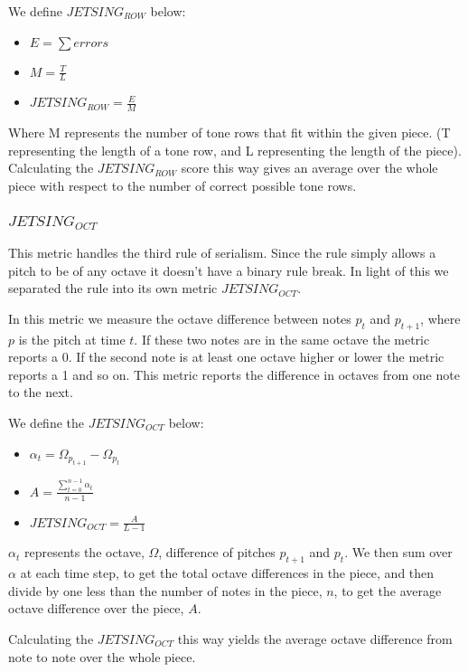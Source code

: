 \documentclass[11pt]{article}
\begin{document}
We define $JETSING_{ROW}$ below:
\begin{itemize}
    \item $E = \sum errors $
    \item $M = \frac{T}{L}$
    \item $JETSING_{ROW} = \frac{E}{M}$
\end{itemize}

Where M represents the number of tone rows that fit within the given piece.
(T representing the length of a tone row, and L representing the length of the piece).
Calculating the $JETSING_{ROW}$ score this way gives an average over the whole piece with respect to the number of correct possible tone rows.

\subsubsection{$JETSING_{OCT}$}
This metric handles the third rule of serialism.
Since the rule simply allows a pitch to be of any octave it doesn't have a binary rule break.
In light of this we separated the rule into its own metric $JETSING_{OCT}$.

In this metric we measure the octave difference between notes $p_t$ and $p_{t+1}$, where $p$ is the pitch at time $t$.
If these two notes are in the same octave the metric reports a 0.
If the second note is at least one octave higher or lower the metric reports a 1 and so on.
This metric reports the difference in octaves from one note to the next.

We define the $JETSING_{OCT}$ below:

\begin{itemize}
    \item $\alpha_t = \Omega_{p_{t+1}} - \Omega_{p_t}$
    \item $A = \frac{\sum_{t=0}^{n-1} \alpha_t}{n-1}$
    \item $JETSING_{OCT} = \frac{A}{L-1} $
\end{itemize}

$\alpha_t$ represents the octave, $\Omega$, difference of pitches $p_{t+1}$ and $p_t$.
We then sum over $\alpha$ at each time step, to get the total octave differences in the piece,
and then divide by one less than the number of notes in the piece, $n$, to get the average octave difference over the piece, $A$.

Calculating the $JETSING_{OCT}$ this way yields the average octave difference from note to note over the whole piece.
\end{document}
